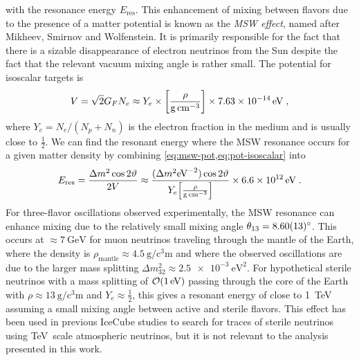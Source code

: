 with the resonance energy $E_\mathrm{res}$.
This enhancement of mixing between flavors due to the presence of a matter potential is known as the \emph{MSW effect}, named after Mikheev, Smirnov and Wolfenstein.
It is primarily responsible for the fact that there is a sizable disappearance of electron neutrinos from the Sun despite the fact that the relevant vacuum mixing angle is rather small.
The potential for isoscalar targets is
\begin{equation}
    V = \sqrt{2}G_F N_e \approx Y_e \times \qty[\frac{\rho}{\si{\gram\per\cm\cubed}}] \times \SI{7.63e-14}{\electronvolt}\;,\label{eq:pot-isoscalar}
\end{equation}
where $Y_e = N_e / (N_p + N_n)$ is the electron fraction in the medium and is usually close to $\frac{1}{2}$.
We can find the resonant energy where the MSW resonance occurs for a given matter density by combining \cref{eq:msw-pot,eq:pot-isoscalar} into
\begin{equation}
    E_\mathrm{res} = \frac{\Delta m^2 \cos 2\vartheta}{2V} \approx \frac{(\Delta m^2\si{\per\electronvolt\squared}) \cos 2\vartheta}{Y_e \qty[\frac{\rho}{\si{\gram\per\cm\cubed}}]}\times\SI{6.6e12}{\electronvolt}\;.
\end{equation}
For three-flavor oscillations observed experimentally, the MSW resonance can enhance mixing due to the relatively small mixing angle $\theta_{13}=\SI{8.6+-0.13}{\degree}$\cite{pdg}.
 This occurs at $\approx \SI{7}{\giga\electronvolt}$ for muon neutrinos traveling through the mantle of the Earth, where the density is $\rho_\mathrm{mantle}\approx\SI{4.5}{\gram\per\cubic\centi\meter}$ and where the observed oscillations are due to the larger mass splitting $\Delta m^2_{32}\approx \SI{2.5e-3}{\electronvolt\squared}$.
For hypothetical sterile neutrinos with a mass splitting of $\order{\SI{1}{\electronvolt}}$ passing through the core of the Earth with $\rho\approx\SI{13}{\gram\per\cubic\centi\meter}$ and $Y_e\approx\frac{1}{2}$, this gives a resonant energy of close to \SI{1}{\tera\electronvolt} assuming a small mixing angle between active and sterile flavors.
This effect has been used in previous IceCube studies\cite{MEOWS} to search for traces of sterile neutrinos using TeV~scale atmospheric neutrinos, but it is not relevant to the analysis presented in this work.

